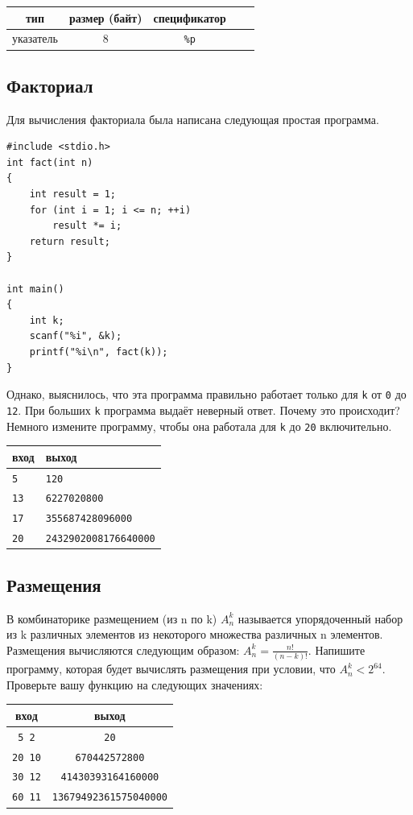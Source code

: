 \documentclass{article}
\begin{document}
\begin{center}
\begin{tabular}{ c c c c c }
 тип & размер (байт)  & спецификатор \\ \hline
 указатель             & 8           & \texttt{\%p} \\ 
\end{tabular}
\end{center}


\subsection{Факториал}
Для вычисления факториала была написана следующая простая программа. 
\begin{lstlisting}
#include <stdio.h>
int fact(int n) 
{
    int result = 1;
    for (int i = 1; i <= n; ++i)
        result *= i;
    return result;
}

int main() 
{
    int k;
    scanf("%i", &k);
    printf("%i\n", fact(k));
}
\end{lstlisting}
Однако, выяснилось, что эта программа правильно работает только для \texttt{k} от \texttt{0} до \texttt{12}. При больших \texttt{k} программа выдаёт неверный ответ. Почему это происходит?
Немного измените программу, чтобы она работала для \texttt{k} до \texttt{20} включительно.

\begin{center}
\begin{tabular}{ l l }
 вход & выход \\ \hline
 \texttt{5} & \texttt{120}  \\ 
 \texttt{13} & \texttt{6227020800} \\
 \texttt{17} & \texttt{355687428096000} \\
 \texttt{20} & \texttt{2432902008176640000} \\
\end{tabular}
\end{center}


\subsection{Размещения}
В комбинаторике размещением (из n по k) $A_n^k$ называется упорядоченный набор из k различных элементов из некоторого множества различных n элементов. Размещения вычисляются следующим образом: $A_n^k = \frac{n!}{(n-k)!}$. Напишите программу, которая будет вычислять размещения при условии, что  $A_n^k < 2^{64}$. Проверьте вашу функцию на следующих значениях:
\begin{center}
\begin{tabular}{ c c }
 вход & выход \\ \hline
 \texttt{5 2} & \texttt{20}  \\ 
 \texttt{20 10} & \texttt{670442572800}  \\ 
 \texttt{30 12} & \texttt{41430393164160000} \\ 
 \texttt{60 11} & \texttt{13679492361575040000} \\   
\end{tabular}
\end{center}
\end{document}
